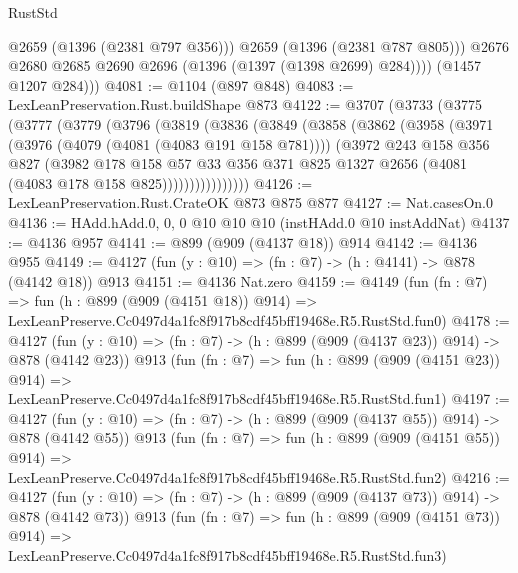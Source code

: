 \begin{lexlean}{RustStd}
\begin{coremodule}
                @2659
                (@1396 (@2381 @797 @356)))
              @2659
              (@1396 (@2381 @787 @805)))
            @2676
            @2680
            @2685
            @2690
            @2696
            (@1396 (@1397 (@1398 @2699) @284))))
        (@1457 @1207 @284)))
@4081 := @1104 (@897 @848)
@4083 := LexLeanPreservation.Rust.buildShape @873
@4122 := @3707
    (@3733
      (@3775
        (@3777
          (@3779
            (@3796
              (@3819
                (@3836
                  (@3849
                    (@3858
                      (@3862
                        (@3958
                          (@3971
                            (@3976 (@4079 (@4081 (@4083 @191 @158 @781))))
                            (@3972
                              @243
                              @158
                              @356
                              @827
                              (@3982
                                @178
                                @158
                                @57
                                @33
                                @356
                                @371
                                @825
                                @1327
                                @2656
                                (@4081 (@4083 @178 @158 @825))))))))))))))))
@4126 := LexLeanPreservation.Rust.CrateOK @873 @875 @877
@4127 := Nat.casesOn.{0}
@4136 := HAdd.hAdd.{0, 0, 0} @10 @10 @10 (instHAdd.{0} @10 instAddNat)
@4137 := @4136 @957
@4141 := @899 (@909 (@4137 @18)) @914
@4142 := @4136 @955
@4149 := @4127 (fun (y : @10) => (fn : @7) -> (h : @4141) -> @878 (@4142 @18)) @913
@4151 := @4136 Nat.zero
@4159 := @4149
    (fun (fn : @7) =>
    fun (h : @899 (@909 (@4151 @18)) @914) =>
    LexLeanPreserve.Cc0497d4a1fc8f917b8cdf45bff19468e.R5.RustStd.fun0)
@4178 := @4127
    (fun (y : @10) => (fn : @7) -> (h : @899 (@909 (@4137 @23)) @914) -> @878 (@4142 @23))
    @913
    (fun (fn : @7) =>
    fun (h : @899 (@909 (@4151 @23)) @914) =>
    LexLeanPreserve.Cc0497d4a1fc8f917b8cdf45bff19468e.R5.RustStd.fun1)
@4197 := @4127
    (fun (y : @10) => (fn : @7) -> (h : @899 (@909 (@4137 @55)) @914) -> @878 (@4142 @55))
    @913
    (fun (fn : @7) =>
    fun (h : @899 (@909 (@4151 @55)) @914) =>
    LexLeanPreserve.Cc0497d4a1fc8f917b8cdf45bff19468e.R5.RustStd.fun2)
@4216 := @4127
    (fun (y : @10) => (fn : @7) -> (h : @899 (@909 (@4137 @73)) @914) -> @878 (@4142 @73))
    @913
    (fun (fn : @7) =>
    fun (h : @899 (@909 (@4151 @73)) @914) =>
    LexLeanPreserve.Cc0497d4a1fc8f917b8cdf45bff19468e.R5.RustStd.fun3)

\end{coremodule}
\end{lexlean}
